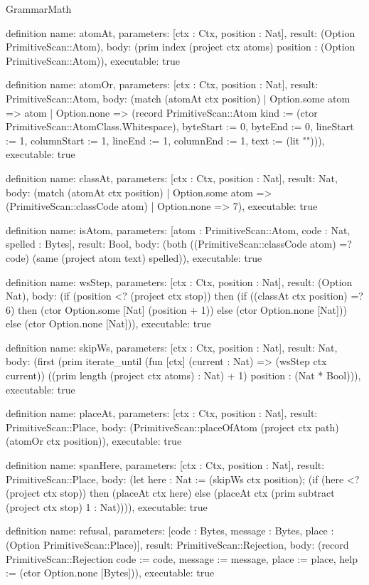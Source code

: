 \begin{lexlean}{GrammarMath}
\begin{semanticmodule}
definition{
  name: atomAt,
  parameters: [ctx : Ctx, position : Nat],
  result: (Option PrimitiveScan::Atom),
  body: (prim index (project ctx atoms) position : (Option PrimitiveScan::Atom)),
  executable: true
}

definition{
  name: atomOr,
  parameters: [ctx : Ctx, position : Nat],
  result: PrimitiveScan::Atom,
  body: (match (atomAt ctx position)
    | Option.some atom => atom
    | Option.none => (record PrimitiveScan::Atom {kind := (ctor PrimitiveScan::AtomClass.Whitespace), byteStart := 0, byteEnd := 0, lineStart := 1, columnStart := 1, lineEnd := 1, columnEnd := 1, text := (lit "")})),
  executable: true
}

definition{
  name: classAt,
  parameters: [ctx : Ctx, position : Nat],
  result: Nat,
  body: (match (atomAt ctx position)
    | Option.some atom => (PrimitiveScan::classCode atom)
    | Option.none => 7),
  executable: true
}

definition{
  name: isAtom,
  parameters: [atom : PrimitiveScan::Atom, code : Nat, spelled : Bytes],
  result: Bool,
  body: (both ((PrimitiveScan::classCode atom) =? code) (same (project atom text) spelled)),
  executable: true
}

definition{
  name: wsStep,
  parameters: [ctx : Ctx, position : Nat],
  result: (Option Nat),
  body: (if (position <? (project ctx stop)) then (if ((classAt ctx position) =? 6) then (ctor Option.some [Nat] (position + 1)) else (ctor Option.none [Nat])) else (ctor Option.none [Nat])),
  executable: true
}

definition{
  name: skipWs,
  parameters: [ctx : Ctx, position : Nat],
  result: Nat,
  body: (first (prim iterate_until (fun [ctx] (current : Nat) => (wsStep ctx current)) ((prim length (project ctx atoms) : Nat) + 1) position : (Nat * Bool))),
  executable: true
}

definition{
  name: placeAt,
  parameters: [ctx : Ctx, position : Nat],
  result: PrimitiveScan::Place,
  body: (PrimitiveScan::placeOfAtom (project ctx path) (atomOr ctx position)),
  executable: true
}

definition{
  name: spanHere,
  parameters: [ctx : Ctx, position : Nat],
  result: PrimitiveScan::Place,
  body: (let here : Nat := (skipWs ctx position); (if (here <? (project ctx stop)) then (placeAt ctx here) else (placeAt ctx (prim subtract (project ctx stop) 1 : Nat)))),
  executable: true
}

definition{
  name: refusal,
  parameters: [code : Bytes, message : Bytes, place : (Option PrimitiveScan::Place)],
  result: PrimitiveScan::Rejection,
  body: (record PrimitiveScan::Rejection {code := code, message := message, place := place, help := (ctor Option.none [Bytes])}),
  executable: true
}


\end{semanticmodule}
\end{lexlean}
